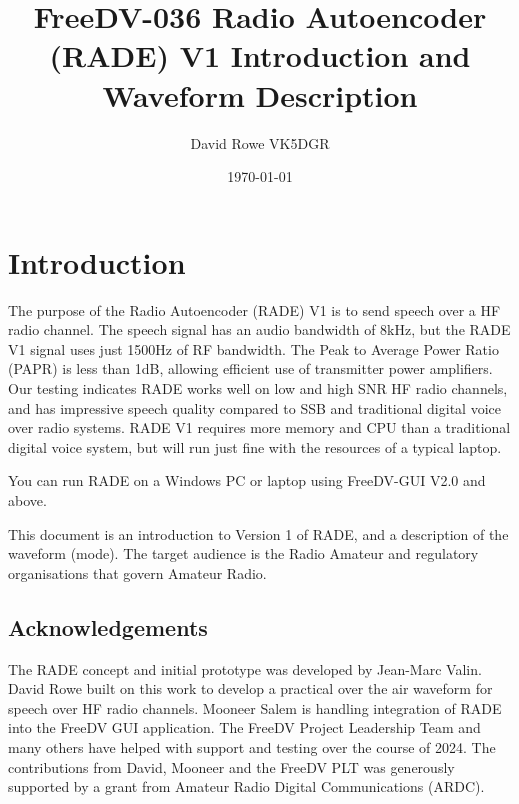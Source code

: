 \documentclass{article}
\begin{document}


\title{FreeDV-036 Radio Autoencoder (RADE) V1 Introduction and Waveform Description}
\author{David Rowe VK5DGR}
\date{\today}
\maketitle

\section{Introduction}

The purpose of the Radio Autoencoder (RADE) V1 is to send speech over a HF radio channel. The speech signal has an audio bandwidth of 8kHz, but the RADE V1 signal uses just 1500Hz of RF bandwidth. The Peak to Average Power Ratio (PAPR) is less than 1dB, allowing efficient use of transmitter power amplifiers. Our testing indicates RADE works well on low and high SNR HF radio channels, and has impressive speech quality compared to SSB and traditional digital voice over radio systems. RADE V1 requires more memory and CPU than a traditional digital voice system, but will run just fine with the resources of a typical laptop.

You can run RADE on a Windows PC or laptop using FreeDV-GUI V2.0 and above.

This document is an introduction to Version 1 of RADE, and a description of the waveform (mode). The target audience is the Radio Amateur and regulatory organisations that govern Amateur Radio.

\subsection{Acknowledgements}

The RADE concept and initial prototype was developed by Jean-Marc Valin. David Rowe built on this work to develop a practical over the air waveform for speech over HF radio channels.  Mooneer Salem is handling integration of RADE into the FreeDV GUI application. The FreeDV Project Leadership Team and many others have helped with support and testing over the course of 2024. The contributions from David, Mooneer and the FreeDV PLT was generously supported by a grant from Amateur Radio Digital Communications (ARDC).
\end{document}
